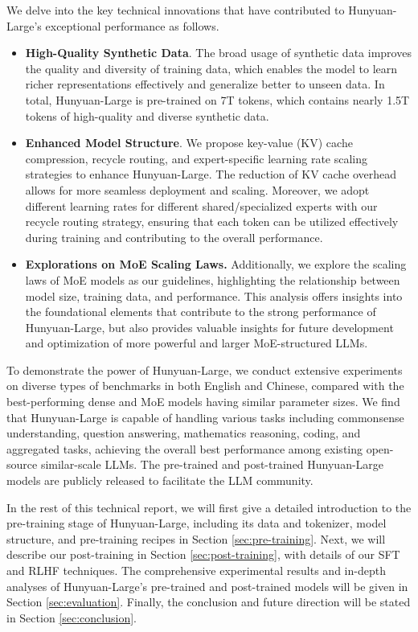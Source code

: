 \documentclass{article}
\begin{document}
We delve into the key technical innovations that have contributed to Hunyuan-Large's exceptional performance as follows.
\begin{itemize}[leftmargin=10pt]
\item \textbf{High-Quality Synthetic Data}. The broad usage of synthetic data improves the quality and diversity of training data, which enables the model to learn richer representations effectively and generalize better to unseen data. In total, Hunyuan-Large is pre-trained on 7T tokens, which contains nearly 1.5T tokens of high-quality and diverse synthetic data.
\item \textbf{Enhanced Model Structure}. We propose key-value (KV) cache compression, recycle routing, and expert-specific learning rate scaling strategies to enhance Hunyuan-Large. The reduction of KV cache overhead allows for more seamless deployment and scaling. Moreover, we adopt different learning rates for different shared/specialized experts with our recycle routing strategy, ensuring that each token can be utilized effectively during training and contributing to the overall performance. 
\item \textbf{Explorations on MoE Scaling Laws.} Additionally, we explore the scaling laws of MoE models as our guidelines, highlighting the relationship between model size, training data, and performance. This analysis offers insights into the foundational elements that contribute to the strong performance of Hunyuan-Large, but also provides valuable insights for future development and optimization of more powerful and larger MoE-structured LLMs.
\end{itemize}

To demonstrate the power of Hunyuan-Large, we conduct extensive experiments on diverse types of benchmarks in both English and Chinese, compared with the best-performing dense and MoE models having similar parameter sizes. We find that Hunyuan-Large is capable of handling various tasks including commonsense understanding, question answering, mathematics reasoning, coding, and aggregated tasks, achieving the overall best performance among existing open-source similar-scale LLMs. 
The pre-trained and post-trained Hunyuan-Large models are publicly released to facilitate the LLM community.

In the rest of this technical report, we will first give a detailed introduction to the pre-training stage of Hunyuan-Large, including its data and tokenizer, model structure, and pre-training recipes in Section \ref{sec:pre-training}. Next, we will describe our post-training in Section \ref{sec:post-training}, with details of our SFT and RLHF techniques. The comprehensive experimental results and in-depth analyses of Hunyuan-Large's pre-trained and post-trained models will be given in Section \ref{sec:evaluation}. Finally, the conclusion and future direction will be stated in Section \ref{sec:conclusion}.
\end{document}
